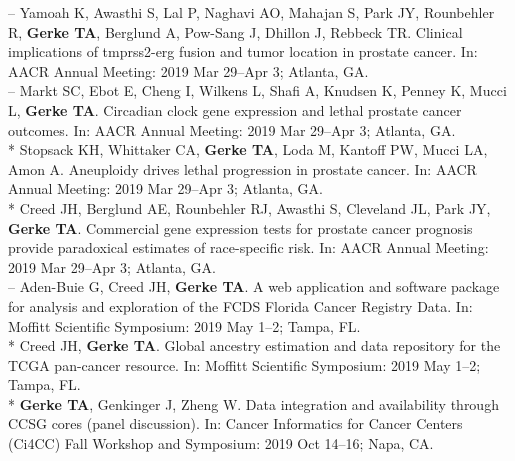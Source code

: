 \documentclass[11pt, a4paper]{article} %
\begin{document}
-- Yamoah K, Awasthi S, Lal P, Naghavi AO, Mahajan S, Park JY, Rounbehler R, {\bf Gerke TA}, Berglund A, Pow-Sang J, Dhillon J, Rebbeck TR. Clinical implications of tmprss2-erg fusion and tumor location in prostate cancer. In: AACR Annual Meeting: 2019 Mar 29--Apr 3; Atlanta, GA.\\

-- Markt SC, Ebot E, Cheng I, Wilkens L, Shafi A, Knudsen K, Penney K, Mucci L, {\bf Gerke TA}. Circadian clock gene expression and lethal prostate cancer outcomes. In: AACR Annual Meeting: 2019 Mar 29--Apr 3; Atlanta, GA.\\

* Stopsack KH, Whittaker CA, {\bf Gerke TA}, Loda M, Kantoff PW, Mucci LA, Amon A. Aneuploidy drives lethal progression in prostate cancer. In: AACR Annual Meeting: 2019 Mar 29--Apr 3; Atlanta, GA.\\

* Creed JH, Berglund AE, Rounbehler RJ, Awasthi S, Cleveland JL, Park JY, {\bf Gerke TA}. Commercial gene expression tests for prostate cancer prognosis provide  paradoxical estimates of race-specific risk. In: AACR Annual Meeting: 2019 Mar 29--Apr 3; Atlanta, GA.\\

-- Aden-Buie G, Creed JH, {\bf Gerke TA}. A web application and software package for analysis and exploration of the FCDS Florida Cancer Registry Data. In: Moffitt Scientific Symposium: 2019 May 1--2; Tampa, FL.\\

* Creed JH, {\bf Gerke TA}. Global ancestry estimation and data repository for the TCGA pan-cancer resource. In: Moffitt Scientific Symposium: 2019 May 1--2; Tampa, FL.\\

* {\bf Gerke TA}, Genkinger J, Zheng W. Data integration and availability through CCSG cores (panel discussion). In: Cancer Informatics for Cancer Centers (Ci4CC) Fall Workshop and Symposium: 2019 Oct 14--16; Napa, CA.
\end{document}
